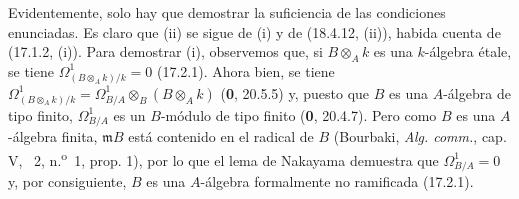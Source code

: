 Evidentemente, solo hay que demostrar la suficiencia de las condiciones enunciadas. Es claro que (ii) se sigue de (i) y de (18.4.12, (ii)), habida cuenta de (17.1.2, (i)). Para demostrar (i), observemos que, si $B\otimes_A k$ es una $k$-álgebra étale, se tiene $\Omega^1_{(B\otimes_A k)/k}=0$ (17.2.1). Ahora bien, se tiene $\Omega^1_{(B\otimes_A k)/k}=\Omega^1_{B/A}\otimes_B(B\otimes_A k)$ (\textbf 0, 20.5.5) y, puesto que $B$ es una $A$-álgebra de tipo finito, $\Omega^1_{B/A}$ es un $B$-módulo de tipo finito (\textbf 0, 20.4.7). Pero como $B$ es una $A$-álgebra finita, $\mathfrak mB$ está contenido en el radical de $B$ (Bourbaki, \emph{Alg. comm.}, cap. V, \textsection~2, n.\textsuperscript{o}~1, prop. 1), por lo que el lema de Nakayama demuestra que $\Omega^1_{B/A}=0$ y, por consiguiente, $B$ es una $A$-álgebra formalmente no ramificada (17.2.1).
